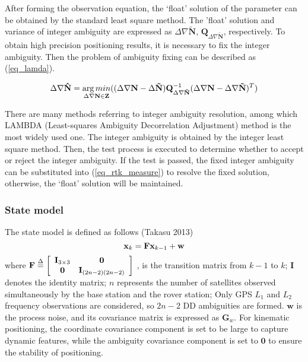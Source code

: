 \documentclass[journal]{IEEEtran}
\begin{document}
After forming the observation equation, the ‘float’ solution of the parameter can be obtained by the standard least square method. 
The 'float' solution and variance of integer ambiguity are expressed as  $\Delta \nabla \mathbf{\tilde{N}} $,  ${{\mathbf{Q}}_{\Delta \nabla \mathbf{\tilde{N}}}} $, respectively. 
To obtain high precision positioning results, it is necessary to fix the integer ambiguity. 
Then the problem of ambiguity fixing can be described as (\ref{eq_lamda})\cite{teunissen1995the}.
\begin{figure*}
	\begin{equation}
	\Delta \nabla {\bf{\hat N}} = \mathop {\arg min}\limits_{\Delta \nabla {\bf{N}} \in {\bf{Z}}} ((\Delta \nabla {\bf{N}} - \Delta  {\bf{\tilde N}}){\bf{Q}}_{\Delta \nabla {\bf{\tilde N}}}^{ - 1}{(\Delta \nabla {\bf{N}} - \Delta \nabla {\bf{\tilde N}})^T})
	\label{eq_lamda}
	\end{equation}
\end{figure*}
There are many methods referring to integer ambiguity resolution, among which LAMBDA (Least-squares Ambiguity Decorrelation Adjustment)\cite{teunissen1995the} method is the most widely used one. The integer ambiguity is obtained by the integer least square method. Then, the test process is executed to determine whether to accept or reject the integer ambiguity\cite{teunissen2003integer,teunissen2005gnss}. If the test is passed, the fixed integer ambiguity can be substituted into (\ref{eq_rtk_measure}) to resolve the fixed solution, otherwise, the ‘float’ solution will be maintained.

\subsubsection{State model}
The state model is defined as follows (Takasu 2013)
\begin{equation}
{{\bf{x}}_k} = {\bf{F}}{{\bf{x}}_{k - 1}} + {\bf{w}}
\end{equation}
where ${\bf{F}} \buildrel \Delta \over = \left[ {\begin{array}{*{20}{c}}
	{{{\bf{I}}_{3 \times 3}}}&{\bf{0}}\\
	{\bf{0}}&{{{\bf{I}}_{(2n - 2)(2n - 2)}}}
	\end{array}} \right]$ , is the transition matrix from $k-1$ to $k$; $\mathbf{I}$ denotes the identity matrix; $n$ represents the number of satellites observed simultaneously by the base station and the rover station; 
Only GPS ${{L}_{1}}$ and ${{L}_{2}}$ frequency observations are considered, so $2n-2$ DD ambiguities are formed. 
$\mathbf{w}$ is the process noise, and its covariance matrix is expressed as ${{\mathbf{G}}_{w}}$. 
For kinematic positioning, the coordinate covariance component is set to be large to capture dynamic features, while the ambiguity covariance component is set to $\mathbf{0}$ to ensure the stability of positioning.
\end{document}

